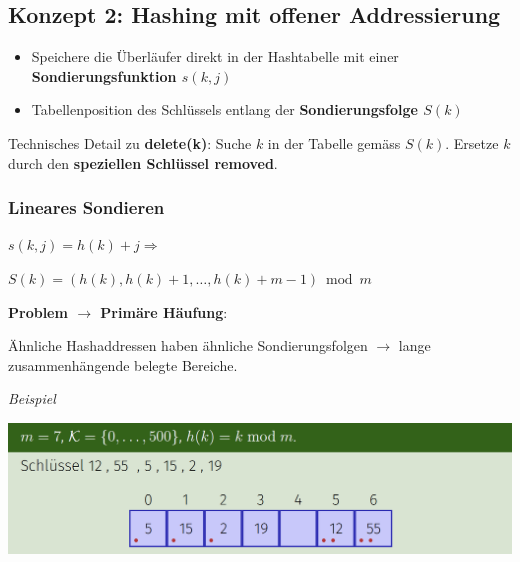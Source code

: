 \vspace{-4pt}
\begin{sectionbox}
\subsection{Konzept 2: Hashing mit offener Addressierung}\par\smallskip
\begin{itemize}
    \item Speichere die Überläufer direkt in der Hashtabelle mit einer \textbf{Sondierungsfunktion $s(k,j)$}
    \item Tabellenposition des Schlüssels entlang der \textbf{Sondierungsfolge $S(k)$}
\end{itemize}\par\smallskip
Technisches Detail zu \textbf{delete(k)}: Suche $k$ in der Tabelle gemäss $S(k)$. Ersetze $k$ durch den \textbf{speziellen Schlüssel removed}.\par\vspace{7px}
\end{sectionbox}
\vspace{-4pt}
\begin{sectionbox}
\subsubsection{Lineares Sondieren}\par\smallskip
\begin{center}
    $s(k, j)=h(k)+j \Rightarrow$ \par $S(k)=(h(k), h(k)+1, \ldots, h(k)+m-1) \bmod m$
\end{center}\par\smallskip
\textbf{Problem $\rightarrow$ Primäre Häufung}:\par Ähnliche Hashaddressen haben ähnliche Sondierungsfolgen $\rightarrow$ lange zusammenhängende belegte Bereiche.\par\smallskip
\textit{Beispiel}\par
\begin{center}
    \includegraphics[width = 0.9\columnwidth]{../img/BspLinSond.png}
\end{center}
\end{sectionbox}
